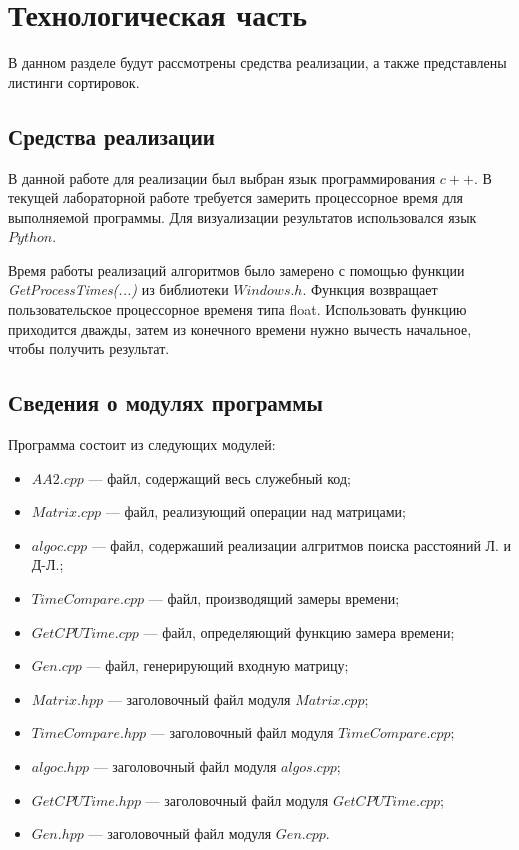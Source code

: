 \chapter{Технологическая часть}
В данном разделе будут рассмотрены средства реализации, а также представлены листинги сортировок.
\section{Средства реализации}
В данной работе для реализации был выбран язык программирования $c++$. В текущей лабораторной работе требуется замерить процессорное время для выполняемой программы. Для визуализации результатов использовался язык $Python$.

Время работы реализаций алгоритмов было замерено с помощью функции \textit{GetProcessTimes(...)} \cite{time} из библиотеки $Windows.h$. Функция возвращает пользовательское процессорное временя типа float.
Использовать функцию приходится дважды, затем из конечного времени нужно вычесть начальное, чтобы получить результат.


\section{Сведения о модулях программы}
Программа состоит из следующих модулей:
\begin{itemize}
	\item $AA2.cpp$ --- файл, содержащий весь служебный код;
	\item $Matrix.cpp$ --- файл, реализующий операции над матрицами;
	\item $algoc.cpp$ --- файл, содержаший реализации алгритмов поиска расстояний Л. и Д-Л.;
	\item $TimeCompare.cpp$ --- файл, производящий замеры времени;
	\item $GetCPUTime.cpp$ --- файл, определяющий функцию замера времени;
	\item $Gen.cpp$ --- файл, генерирующий входную матрицу;
	\item $Matrix.hpp$ --- заголовочный файл модуля $Matrix.cpp$;
	\item $TimeCompare.hpp$ --- заголовочный файл модуля $TimeCompare.cpp$;
	\item $algoc.hpp$ --- заголовочный файл модуля $algos.cpp$;
	\item $GetCPUTime.hpp$ --- заголовочный файл модуля $GetCPUTime.cpp$;
	\item $Gen.hpp$ --- заголовочный файл модуля $Gen.cpp$.
\end{itemize}

